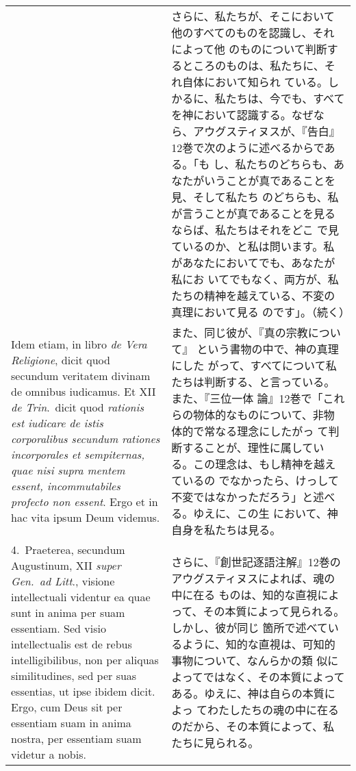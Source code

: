 \documentclass[10pt]{jsarticle} %
\begin{document}
\begin{longtable}{p{21em}p{21em}}
&

さらに、私たちが、そこにおいて他のすべてのものを認識し、それによって他
のものについて判断するところのものは、私たちに、それ自体において知られ
ている。しかるに、私たちは、今でも、すべてを神において認識する。なぜな
ら、アウグスティヌスが、『告白』12巻で次のように述べるからである。「も
し、私たちのどちらも、あなたがいうことが真であることを見、そして私たち
のどちらも、私が言うことが真であることを見るならば、私たちはそれをどこ
で見ているのか、と私は問います。私があなたにおいてでも、あなたが私にお
いてでもなく、両方が、私たちの精神を越えている、不変の真理において見る
のです」。（続く）

\\

Idem etiam, in libro {\it de Vera Religione}, dicit quod secundum
veritatem divinam de omnibus iudicamus. Et XII {\it de Trin}.~dicit
quod {\it rationis est iudicare de istis corporalibus secundum
rationes incorporales et sempiternas, quae nisi supra mentem essent,
incommutabiles profecto non essent}. Ergo et in hac vita ipsum Deum
videmus.


&

また、同じ彼が、『真の宗教について』 という書物の中で、神の真理にした
がって、すべてについて私たちは判断する、と言っている。また、『三位一体
論』12巻で「これらの物体的なものについて、非物体的で常なる理念にしたがっ
て判断することが、理性に属している。この理念は、もし精神を越えているの
でなかったら、けっして不変ではなかっただろう」と述べる。ゆえに、この生
において、神自身を私たちは見る。


\\

4.~{\sc Praeterea}, secundum Augustinum, XII {\it super Gen.~ad
Litt}., visione intellectuali videntur ea quae sunt in anima per suam
essentiam. Sed visio intellectualis est de rebus intelligibilibus, non
per aliquas similitudines, sed per suas essentias, ut ipse ibidem
dicit. Ergo, cum Deus sit per essentiam suam in anima nostra, per
essentiam suam videtur a nobis.


&

さらに、『創世記逐語注解』12巻のアウグスティヌスによれば、魂の中に在る
ものは、知的な直視によって、その本質によって見られる。しかし、彼が同じ
箇所で述べているように、知的な直視は、可知的事物について、なんらかの類
似によってではなく、その本質によってある。ゆえに、神は自らの本質によっ
てわたしたちの魂の中に在るのだから、その本質によって、私たちに見られる。

\\





\end{longtable}
\end{document}
